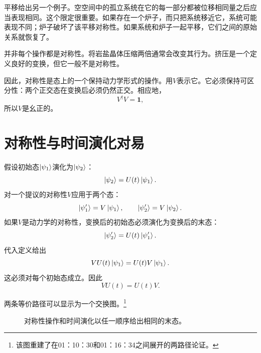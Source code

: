 平移给出另一个例子。空空间中的孤立系统在它的每一部分都被位移相同量之后应当表现相同。这个限定很重要。如果存在一个炉子，而只把系统移近它，系统可能表现不同；炉子破坏了该平移对称性。如果系统和炉子一起平移，它们之间的原始关系就恢复了。

并非每个操作都是对称性。将岩盐晶体压缩两倍通常会改变其行为。挤压是一个定义良好的变换，但它一般不是对称性。

因此，对称性是态上的一个保持动力学形式的操作。用\(V\)表示它。它必须保持可区分性：两个正交态在变换后必须仍然正交。相应地，
\begin{equation}
V^\dagger V=\mathbf 1,
\end{equation}
所以\(V\)是幺正的。

\section{对称性与时间演化对易}

假设初始态\(\left\lvert\psi_1\right\rangle\)演化为\(\left\lvert\psi_2\right\rangle\)：
\begin{equation}
\left\lvert\psi_2\right\rangle=U(t)\left\lvert\psi_1\right\rangle.
\end{equation}
对一个提议的对称性\(V\)应用于两个态：
\begin{equation}
\left\lvert\psi_1'\right\rangle=V\left\lvert\psi_1\right\rangle,
\qquad
\left\lvert\psi_2'\right\rangle=V\left\lvert\psi_2\right\rangle.
\end{equation}
如果\(V\)是动力学的对称性，变换后的初始态必须演化为变换后的末态：
\begin{equation}
\left\lvert\psi_2'\right\rangle=U(t)\left\lvert\psi_1'\right\rangle.
\end{equation}
代入定义给出
\begin{equation}
VU(t)\left\lvert\psi_1\right\rangle
=
U(t)V\left\lvert\psi_1\right\rangle.
\end{equation}
这必须对每个初始态成立。因此
\begin{equation}
VU(t)=U(t)V.
\end{equation}

两条等价路径可以显示为一个交换图。\footnote{该图重建了在01：10：30和01：16：34之间展开的两路径论证。}
\begin{figure}
\centering
{}
\caption{对称性操作和时间演化以任一顺序给出相同的末态。}
\end{figure}

